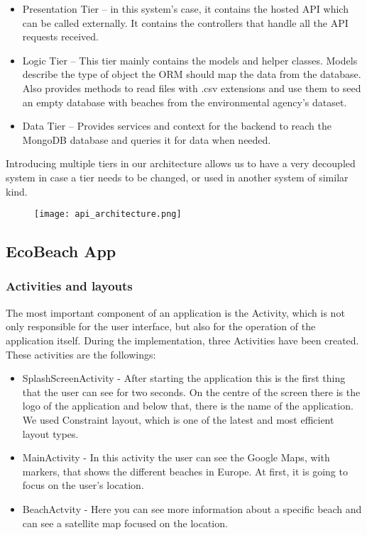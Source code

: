 \begin{itemize}
    \item Presentation Tier – in this system’s case, it contains the hosted API which can be called externally. It contains the controllers that handle all the API requests received.
    \item Logic Tier – This tier mainly contains the models and helper classes. Models describe the type of object the ORM should map the data from the database. Also provides methods to read files with .csv extensions and use them to seed an empty database with beaches from the environmental agency’s dataset.
    \item Data Tier – Provides services and context for the backend to reach the MongoDB database and queries it for data when needed. 
\end{itemize}

Introducing multiple tiers in our architecture allows us to have a very decoupled system in case a tier needs to be changed, or used in another system of similar kind. 

\begin{figure}[h!]
    \centering
    \texttt{[image: api\_architecture.png]}
    \caption{}
    \label{fig:api_architecture}
\end{figure}

\subsection{EcoBeach App}\label{subsec:ecobeach-app}

\subsubsection{Activities and layouts}

The most important component of an application is the Activity, which is not only responsible for the user interface, but also for the operation of the application itself. During the implementation, three Activities have been created. These activities are the followings:

\begin{itemize}
    \item SplashScreenActivity - After starting the application this is the first thing that the user can see for two seconds. On the centre of the screen there is the logo of the application and below that, there is the name of the application. We used Constraint layout, which is one of the latest and most efficient layout types.
    \item MainActivity - In this activity the user can see the Google Maps, with markers, that shows the different beaches in Europe. At first, it is going to focus on the user’s location.
    \item BeachActvity - Here you can see more information about a specific beach and can see a satellite map focused on the location.
\end{itemize}

